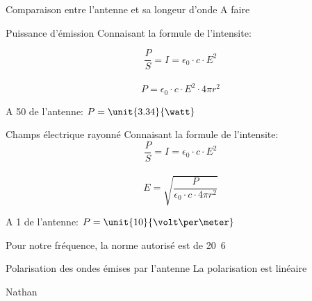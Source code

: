 \documentclass[pdf]{beamer}
\begin{document}
%
%

\begin{frame}{Comparaison entre l'antenne et sa longeur d'onde}
A faire

\end{frame}


%
%

\begin{frame}{Puissance d'émission}
Connaisant la formule de l'intensite:

$$\frac{P}{S}=I=\epsilon_0 \cdot c \cdot E^2 $$\\ %

$$P=\epsilon_0 \cdot c \cdot E^2 \cdot 4 \pi  r^2$$



\begin{center}
A \unit{50}{\meter} de l'antenne: $P= \unit{3.34}{\watt} $
\end{center}

\end{frame}

%
%
\begin{frame}{Champs électrique rayonné}
Connaisant la formule de l'intensite:
$$\frac{P}{S}=I=\epsilon_0 \cdot c \cdot E^2 $$\\

$$E =\sqrt{\frac{P}{\epsilon_0 \cdot c \cdot 4\pi r^2}}$$

A \unit{1}{\meter} de l'antenne: $P= \unit{10}{\volt\per\meter} $


Pour notre fréquence, la norme autorisé est de \unit{20.6}{\volt\per\meter}


\end{frame}

%
%

\begin{frame}{Polarisation des ondes émises par l'antenne}
La polarisation est linéaire

\end{frame}

%
%
\begin{frame}{}

Nathan
\end{frame}

 
\end{document}
